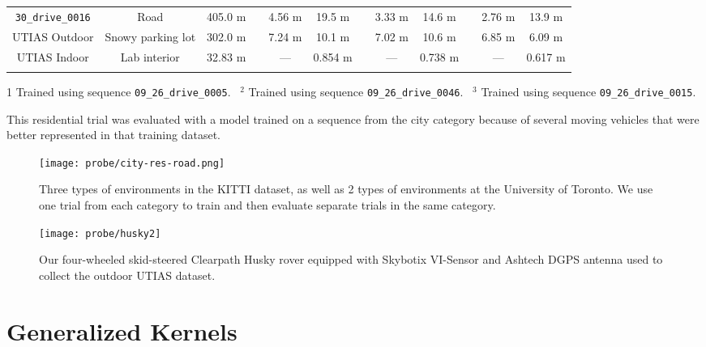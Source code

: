 \begin{table}
{\begin{threeparttable}
\begin{tabular}{cccccccccccc}
        		\texttt{30\_drive\_0016} & Road \tnote{3} & 405.0 m && 4.56 m & 19.5 m && 3.33 m & 14.6 m && 2.76 m & 13.9 m \\ 
                UTIAS Outdoor & Snowy parking lot & 302.0 m && 7.24 m & 10.1 m && 7.02 m & 10.6 m && 6.85 m & 6.09 m \\ 
                UTIAS Indoor & Lab interior & 32.83 m && --- & 0.854 m && --- & 0.738 m && --- & 0.617 m  \B \\    
        \hline
            \label{table:probe_kitti_data}
        \end{tabular}
        \begin{tablenotes}
            \item[1] Trained using sequence \texttt{09\_26\_drive\_0005}. ~$^2$ Trained using sequence  \texttt{09\_26\_drive\_0046}. ~$^3$ Trained using sequence  \texttt{09\_26\_drive\_0015}.  
            \item[\dag] This residential trial was evaluated with a model trained on a sequence from the city category because of several moving vehicles that were better represented in that training dataset.
        \end{tablenotes}
    \end{threeparttable}
    }
\end{table}

\begin{figure}
    \centering
    \texttt{[image: probe/city-res-road.png]}
    \caption{Three types of environments in the KITTI dataset, as well as 2 types of environments at the University of Toronto.  We use one trial from each category to train and then evaluate separate trials in the same category.}
    \label{fig:probe_KITTI-Types}
\end{figure}

\begin{figure}
    \centering
    \texttt{[image: probe/husky2]}
    \caption{Our four-wheeled skid-steered Clearpath Husky rover equipped with Skybotix VI-Sensor and Ashtech DGPS antenna used to collect the outdoor UTIAS dataset.}
    \label{fig:probe_huskypic}
\end{figure}

\section{Generalized Kernels}

